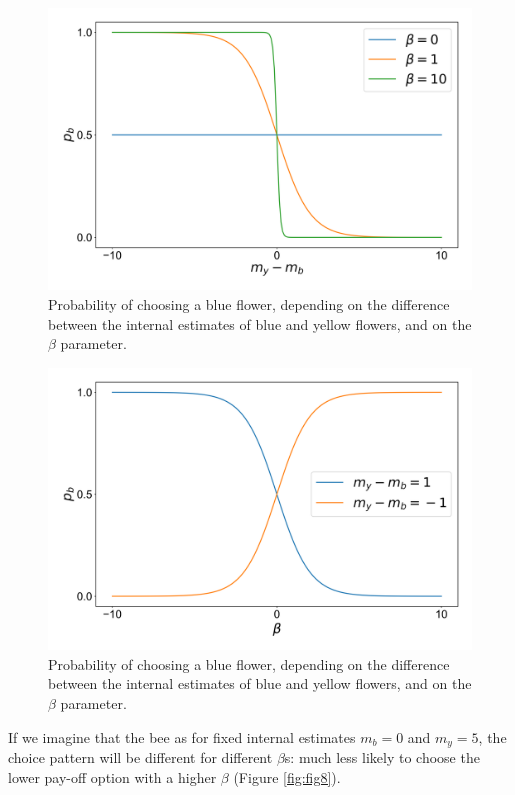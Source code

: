 \documentclass{article}
\begin{document}
\begin{figure}[H]
\centering
\includegraphics[width=.8\linewidth]{fig2_report9.png}
\caption[growing population]{Probability of choosing a blue flower, depending on the difference between the internal estimates of blue and yellow flowers, and on the $\beta$ parameter.}\label{fig:fig6}
\end{figure}

\begin{figure}[H]
\centering
\includegraphics[width=.8\linewidth]{fig2_report10.png}
\caption[growing population]{Probability of choosing a blue flower, depending on the difference between the internal estimates of blue and yellow flowers, and on the $\beta$ parameter.}\label{fig:fig7}
\end{figure}

If we imagine that the bee as for fixed internal estimates $m_b = 0$ and $m_y = 5$, the choice pattern will be different for different $\beta$s: much less likely to choose the lower pay-off option with a higher $\beta$ (Figure \ref{fig:fig8}).
\end{document}
